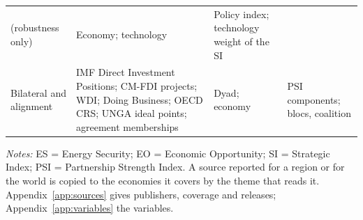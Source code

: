 \begin{table}[tbp]
\begin{threeparttable}
\begin{tabularx}{\textwidth}{@{}>{\raggedright\arraybackslash}p{2.3cm}
  >{\raggedright\arraybackslash}X >{\raggedright\arraybackslash}p{2.0cm}
  >{\raggedright\arraybackslash}p{4.2cm}@{}}
  (robustness only) & Economy; technology & Policy index; technology weight of the SI\\[2pt]
Bilateral and alignment & IMF Direct Investment Positions; CM-FDI projects; WDI; Doing Business;
  OECD CRS; UNGA ideal points; agreement memberships & Dyad; economy & PSI components; blocs,
  coalition\\
\bottomrule
\end{tabularx}
\begin{tablenotes}[flushleft]\footnotesize
\item \textit{Notes:} ES = Energy Security; EO = Economic Opportunity; SI = Strategic Index;
PSI = Partnership Strength Index. A source reported for a region or for the world is copied to
the economies it covers by the theme that reads it. Appendix~\ref{app:sources} gives publishers,
coverage and releases; Appendix~\ref{app:variables} the variables.
\end{tablenotes}
\end{threeparttable}
\end{table}

